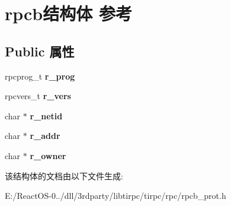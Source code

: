 \hypertarget{structrpcb}{}\section{rpcb结构体 参考}
\label{structrpcb}
\subsection*{Public 属性}
\begin{DoxyCompactItemize}
\item 
\mbox{\label{structrpcb_acc8da2cd27162f208f002be475954e89}} 
rpcprog\+\_\+t {\bfseries r\+\_\+prog}
\item 
\mbox{\label{structrpcb_a7b5e42c164650ea8f8a878d306af8887}} 
rpcvers\+\_\+t {\bfseries r\+\_\+vers}
\item 
\mbox{\label{structrpcb_a54082452c69b8bd1fb6b932d2d76b763}} 
char $\ast$ {\bfseries r\+\_\+netid}
\item 
\mbox{\label{structrpcb_adbed543f9f71e39a686b2221b6301ef7}} 
char $\ast$ {\bfseries r\+\_\+addr}
\item 
\mbox{\label{structrpcb_aaf4caf27956a081fc5c5407863fc1239}} 
char $\ast$ {\bfseries r\+\_\+owner}
\end{DoxyCompactItemize}


该结构体的文档由以下文件生成\+:\begin{DoxyCompactItemize}
\item 
E\+:/\+React\+O\+S-\/0../dll/3rdparty/libtirpc/tirpc/rpc/rpcb\+\_\+prot.\+h\end{DoxyCompactItemize}
